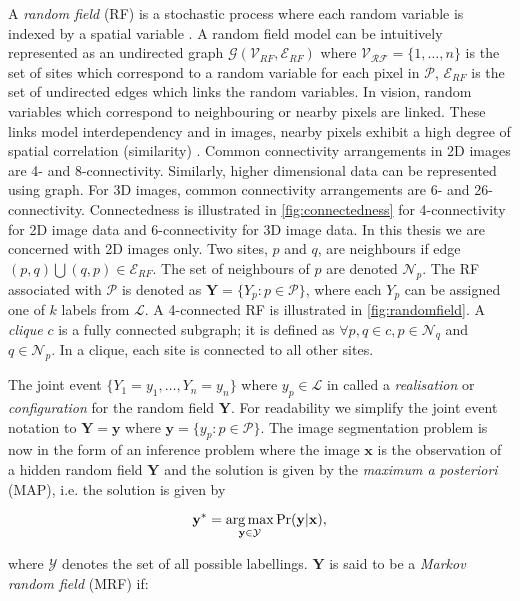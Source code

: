 A \textit{random field} (RF) is a stochastic process where each random variable is indexed by a spatial variable \citep{Adler2007,Gikhman1996}.
A random field model can be intuitively represented as an undirected graph $\mathcal{G}(\mathcal{V}_{RF},\mathcal{E}_{RF})$ where $\mathcal{V_{RF}} = \{1, \ldots, n\}$ is the set of sites which correspond to a random variable for each pixel in $\mathcal{P}$, $\mathcal{E}_{RF}$ is the set of undirected edges which links the random variables.
In vision, random variables which correspond to neighbouring or nearby pixels are linked.
These links model interdependency and in images, nearby pixels exhibit a high degree of spatial correlation (similarity) \citep{Brett2003}.
Common connectivity arrangements in 2D images are 4- and 8-connectivity.
Similarly, higher dimensional data can be represented using graph.
For 3D images, common connectivity arrangements are 6- and 26-connectivity.
Connectedness is illustrated in \autoref{fig:connectedness} for 4-connectivity for 2D image data and 6-connectivity for 3D image data.
In this thesis we are concerned with 2D images only.
Two sites, $p$ and $q$, are neighbours if edge $(p,q) \bigcup (q,p) \in \mathcal{E}_{RF}$.
The set of neighbours of $p$ are denoted $\mathcal{N}_p$.
The RF associated with $\mathcal{P}$ is denoted as $\mathbf{Y} = \{Y_p:p \in \mathcal{P}\}$, where each $Y_p$ can be assigned one of $k$ labels from $\mathcal{L}$.
A 4-connected RF is illustrated in \autoref{fig:randomfield}.
A \textit{clique} $c$ is a fully connected subgraph; it is defined as $\forall p,q \in c, p \in \mathcal{N}_q$ and $q \in \mathcal{N}_p$.
In a clique, each site is connected to all other sites.

The joint event $\{Y_1=y_1, \ldots, Y_n=y_n\}$ where $y_p \in \mathcal{L}$ in called a \textit{realisation} or \textit{configuration} for the random field $\mathbf{Y}$.
For readability we simplify the joint event notation to $\mathbf{Y}=\mathbf{y}$ where $\mathbf{y}=\{y_p : p \in \mathcal{P}\}$.
The image segmentation problem is now in the form of an inference problem where the image $\mathbf{x}$ is the observation of a hidden random field $\mathbf{Y}$ and the solution is given by the \textit{maximum a posteriori} (MAP), i.e. the solution is given by

\begin{equation}
	\mathbf{y^*} = \operatorname*{arg\,max}_{\mathbf{y} \in \mathcal{Y}}\Pr(\mathbf{y}|\mathbf{x}),
	\label{eq:mrfprobability}
\end{equation}

where $\mathcal{Y}$ denotes the set of all possible labellings. $\mathbf{Y}$ is said to be a \textit{Markov random field} (MRF) if:

